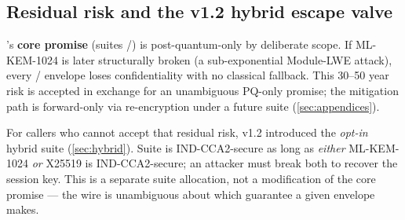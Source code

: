 \subsection*{Residual risk and the v1.2 hybrid escape valve}

\pqcrypt{}'s \textbf{core promise} (suites /) is post-quantum-only by deliberate scope. If ML-KEM-1024 is later structurally broken (a sub-exponential Module-LWE attack), every / envelope loses confidentiality with no classical fallback. This 30--50 year risk is accepted in exchange for an unambiguous PQ-only promise; the mitigation path is forward-only via re-encryption under a future suite (\cref{sec:appendices}).

For callers who cannot accept that residual risk, v1.2 introduced the \emph{opt-in} hybrid suite  (\cref{sec:hybrid}). Suite  is IND-CCA2-secure as long as \emph{either} ML-KEM-1024 \emph{or} X25519 is IND-CCA2-secure; an attacker must break both to recover the session key. This is a separate suite allocation, not a modification of the core promise --- the wire is unambiguous about which guarantee a given envelope makes.
